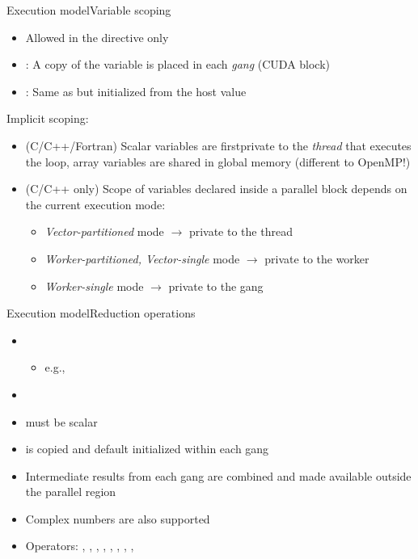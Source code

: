 \documentclass[12pt,aspectratio=169]{beamer}
\begin{document}
\begin{frame}[fragile]{Execution model}{Variable scoping}
  \begin{itemize}
  \item Allowed in the  directive only
  \item {}: A copy of the variable is placed in each \emph{gang} (CUDA block)
  \item {}: Same as  but initialized from the host value
  \end{itemize}
  \pause
  Implicit scoping:
  \begin{itemize}
  \item (C/C++/Fortran) Scalar variables are firstprivate to the \emph{thread} that executes the loop, array variables are shared in global memory (different to OpenMP!)
  \item (C/C++ only) Scope of variables declared inside a parallel block depends on the current execution mode:
    \begin{itemize}
    \item \emph{Vector-partitioned} mode $\rightarrow$ private to the thread
    \item \emph{Worker-partitioned, Vector-single} mode $\rightarrow$ private to the worker
    \item \emph{Worker-single} mode $\rightarrow$ private to the gang
    \end{itemize}
  \end{itemize}
\end{frame}

\begin{frame}[fragile]{Execution model}{Reduction operations}
  \begin{itemize}
  \item {}
    \begin{itemize}
    \item e.g., 
    \end{itemize}
  \item {}
  \item {} must be scalar
  \item {} is copied and default initialized within each gang
  \item Intermediate results from each gang are combined and made available outside the parallel region
  \item Complex numbers are also supported
  \item Operators: \lstinlineCpp{+}, \lstinlineCpp{*}, , , \lstinlineCpp{&}, \lstinlineCpp{|}, \lstinlineCpp{\%}, \lstinlineCpp{&&}, \lstinlineCpp{||}
  \end{itemize}
\end{frame}
\end{document}
